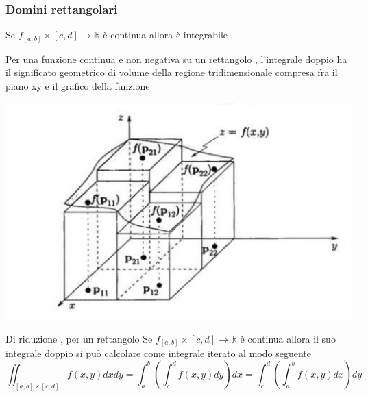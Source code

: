 \documentclass{article}
\theoremstyle{definition}
\newcommand{\R}{\mathbb{R}}
\begin{document}
	\subsubsection{Domini rettangolari}
	\begin{teo}{}{}
		Se $f_[a,b]\times [c,d] \rightarrow \R$ è continua allora è integrabile 
	\end{teo}
	Per una funzione continua e non negativa su un rettangolo , l'integrale doppio ha il significato geometrico di volume della regione tridimensionale compresa fra il piano xy e il grafico della funzione 
	\begin{center}
		\centering
		\includegraphics[scale=0.40]{immagini/Screenshot 2024-11-21 at 15.51.25.png}
	\end{center}
	\begin{teo}{Di riduzione , per un rettangolo }{}
		Se $f_[a,b]\times [c,d] \rightarrow \R$ è continua allora il suo integrale doppio si può calcolare come integrale iterato al modo seguente $$\iint_{[a,b]\times [c,d]}f(x,y)dxdy=\int_a^b\left ( \int_c^df(x,y)dy\right)dx =\int_c^d\left ( \int_a^bf(x,y)dx\right)dy $$
	\end{teo}
\end{document}
